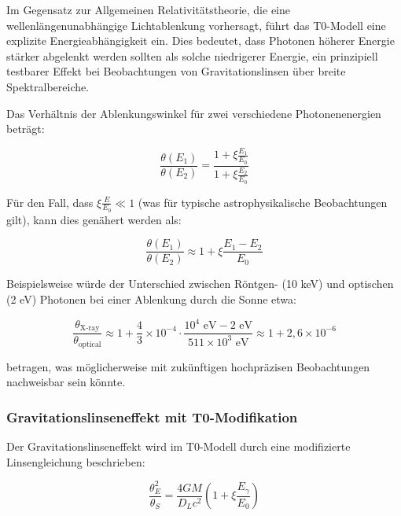 \documentclass[12pt,a4paper]{article}
\theoremstyle{definition}
\begin{document}
\begin{wichtig}
	Im Gegensatz zur Allgemeinen Relativitätstheorie, die eine wellenlängenunabhängige Lichtablenkung vorhersagt, führt das T0-Modell eine explizite Energieabhängigkeit ein. Dies bedeutet, dass Photonen höherer Energie stärker abgelenkt werden sollten als solche niedrigerer Energie, ein prinzipiell testbarer Effekt bei Beobachtungen von Gravitationslinsen über breite Spektralbereiche.
\end{wichtig}

\begin{verhaltnis}
	Das Verhältnis der Ablenkungswinkel für zwei verschiedene Photonenenergien beträgt:
	
	\begin{equation}
		\frac{\theta(E_1)}{\theta(E_2)} = \frac{1 + \xi \frac{E_1}{E_0}}{1 + \xi \frac{E_2}{E_0}}
	\end{equation}
	
	Für den Fall, dass $\xi \frac{E}{E_0} \ll 1$ (was für typische astrophysikalische Beobachtungen gilt), kann dies genähert werden als:
	
	\begin{equation}
		\frac{\theta(E_1)}{\theta(E_2)} \approx 1 + \xi \frac{E_1 - E_2}{E_0}
	\end{equation}
	
	Beispielsweise würde der Unterschied zwischen Röntgen- (10 keV) und optischen (2 eV) Photonen bei einer Ablenkung durch die Sonne etwa:
	
	\begin{equation}
		\frac{\theta_{\text{X-ray}}}{\theta_{\text{optical}}} \approx 1 + \frac{4}{3} \times 10^{-4} \cdot \frac{10^4 \text{ eV} - 2 \text{ eV}}{511 \times 10^3 \text{ eV}} \approx 1 + 2,6 \times 10^{-6}
	\end{equation}
	
	betragen, was möglicherweise mit zukünftigen hochpräzisen Beobachtungen nachweisbar sein könnte.
\end{verhaltnis}

\subsubsection{Gravitationslinseneffekt mit T0-Modifikation}

Der Gravitationslinseneffekt wird im T0-Modell durch eine modifizierte Linsengleichung beschrieben:

\begin{equation}
	\frac{\theta_E^2}{\theta_S} = \frac{4GM}{D_L c^2}\left(1 + \xi \frac{E_\gamma}{E_0}\right)
\end{equation}
\end{document}
